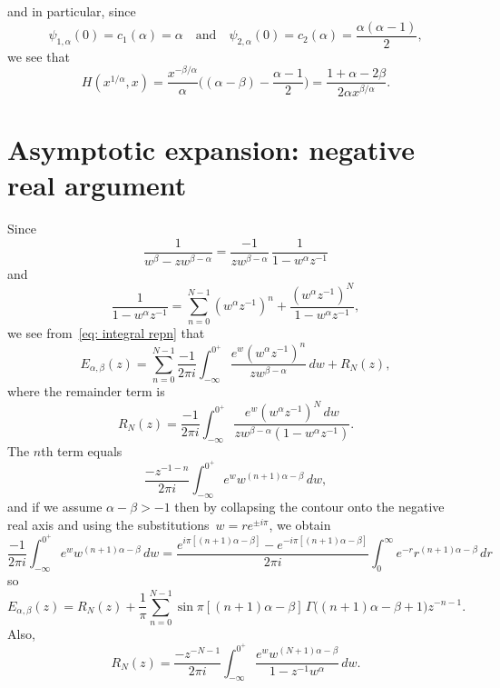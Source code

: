 \documentclass[12pt,a4paper]{article}
\begin{document}
and in particular, since
\begin{equation}\label{eq: psi zero}
\psi_{1,\alpha}(0)=c_1(\alpha)=\alpha
\quad\text{and}\quad
\psi_{2,\alpha}(0)=c_2(\alpha)=\frac{\alpha(\alpha-1)}{2},
\end{equation}
we see that
\[
H(x^{1/\alpha},x)=\frac{x^{-\beta/\alpha}}{\alpha}\biggl((\alpha-\beta)
    -\frac{\alpha-1}{2}\biggr)=\frac{1+\alpha-2\beta}{2\alpha x^{\beta/\alpha}}.
\]

\section{Asymptotic expansion: negative real argument}
Since
\[
\frac{1}{w^\beta-zw^{\beta-\alpha}}=\frac{-1}{zw^{\beta-\alpha}}
    \,\frac{1}{1-w^\alpha z^{-1}}
\]
and
\[
\frac{1}{1-w^\alpha z^{-1}}=\sum_{n=0}^{N-1}(w^\alpha z^{-1})^n
    +\frac{(w^\alpha z^{-1})^N}{1-w^\alpha z^{-1}},
\]
we see from~\eqref{eq: integral repn} that
\[
E_{\alpha,\beta}(z)=\sum_{n=0}^{N-1}\frac{-1}{2\pi i}\int_{-\infty}^{0^+}
    \frac{e^w(w^\alpha z^{-1})^n}{zw^{\beta-\alpha}}\,dw+R_N(z),
\]
where the remainder term is
\[
R_N(z)=\frac{-1}{2\pi i}\int_{-\infty}^{0^+}
    \frac{e^w(w^\alpha z^{-1})^N\,dw}{zw^{\beta-\alpha}(1-w^\alpha z^{-1})}.
\]
The $n$th term equals
\[
\frac{-z^{-1-n}}{2\pi i}\int_{-\infty}^{0^+}e^w w^{(n+1)\alpha-\beta}\,dw,
\]
and if we assume $\alpha-\beta>-1$ then by collapsing the contour onto the 
negative real axis and using the substitutions~$w=re^{\pm i\pi}$, we obtain
\[
\frac{-1}{2\pi i}\int_{-\infty}^{0^+}e^w w^{(n+1)\alpha-\beta}\,dw
    =\frac{e^{i\pi[(n+1)\alpha-\beta]}-e^{-i\pi[(n+1)\alpha-\beta]}}{2\pi i}
    \int_0^\infty e^{-r}r^{(n+1)\alpha-\beta}\,dr
\]
so
\[
E_{\alpha,\beta}(z)=R_N(z)+\frac{1}{\pi}\sum_{n=0}^{N-1}
    \sin\pi[(n+1)\alpha-\beta]\,\Gamma\bigl((n+1)\alpha-\beta+1\bigr)z^{-n-1}.
\]
Also,
\begin{equation}\label{eq: RN(z)}
R_N(z)=\frac{-z^{-N-1}}{2\pi i}\int_{-\infty}^{0^+}
    \frac{e^w w^{(N+1)\alpha-\beta}}{1-z^{-1}w^\alpha}\,dw.
\end{equation}
\end{document}
